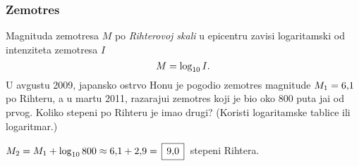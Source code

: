 \subsubsection{Zem{\lj}otres}

\zadatak Magnituda zem{\lj}otresa $M$ po {\sl Rihterovoj skali\/} u epicentru zavisi logaritamski od 
inten\-zi\-te\-ta zem{\lj}otresa $I$ 
$$
M=\log_{10} I.
$$
U avgustu 2009, japansko ostrvo Hon{\sv}u 
je pogodio zem{\lj}otres magnitude $M_1=6\.1$ po Rihteru, a u martu 2011,
razaraju{\cc}i zem{\lj}otres koji je bio oko 800 puta ja{\cv}i od prvog. Koliko stepeni po Rihteru je imao drugi?
(Koristi logaritamske tablice ili logaritmar.)

\resenje $M_2 = M_1 + \logten 800 \approx 6\.1 + 2\.9 = \ram{9\.0}$ stepeni Rihtera. 
